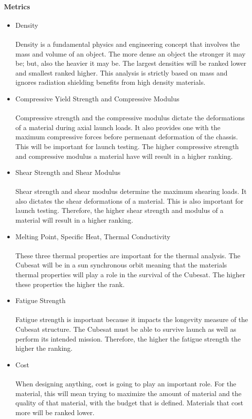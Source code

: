 \paragraph{Metrics}
\begin{itemize}
\item{Density}\\
\\
Density is a fundamental physics and engineering concept that involves the mass and volume of an object. The more dense an object the stronger it may be; but, also the heavier it may be. The largest densities will be ranked lower and smallest ranked higher. This analysis is strictly based on mass and ignores radiation shielding benefits from high density materials.
\\
\item{Compressive Yield Strength and Compressive Modulus}\\
\\
Compressive strength and the compressive modulus dictate the deformations of a material during axial launch loads. It also provides one with the maximum compressive forces before permenant deformation of the chassis. This will be important for launch testing. The higher compressive strength and compressive modulus a material have will result in a higher ranking.
\\
\item{Shear Strength and Shear Modulus}\\
\\
Shear strength and shear modulus determine the maximum shearing loads. It also dictates the shear deformations of a material. This is also important for launch testing. Therefore, the higher shear strength and modulus of a material will result in a higher ranking. 
\\
\item{Melting Point, Specific Heat, Thermal Conductivity}\\
\\
These three thermal properties are important for the thermal analysis. The Cubesat will be in a sun synchronous orbit meaning that the materials thermal properties will play a role in the survival of the Cubesat. The higher these properties the higher the rank. 
\\
\item{Fatigue Strength}\\
\\
Fatigue strength is important because it impacts the longevity measure of the Cubesat structure. The Cubesat must be able to survive launch as well as perform its intended mission. Therefore, the higher the fatigue strength the higher the ranking. 
\\
\item{Cost}\\
\\
When designing anything, cost is going to play an important role. For the material, this will mean trying to maximize the amount of material and the quality of that material, with the budget that is defined. Materials that cost more will be ranked lower. 
\\
\end{itemize}

